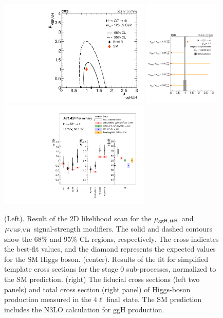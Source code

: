 \documentclass[10pt]{article}
\begin{document}
\begin{figure}[htb]
\centering
\includegraphics[height=2in]{figures/CMS-HIG-16-041_Figure_008-c.pdf}
\includegraphics[height=2in]{figures/CMS-HIG-16-041_Figure_009.pdf}
\includegraphics[height=2in]{figures/ATLAS-HIGG-2016-25__fig_07__xs.pdf}
\caption{
  (Left). Result of the 2D likelihood scan for the ${\rm \mu_{ggH,ttH}}$
  and ${\rm \mu_{VBF,VH}}$ signal-strength modifiers. The solid and dashed
  contours show the 68\% and 95\% CL regions, respectively. The cross
  indicates the best-fit values, and the diamond represents the expected
  values for the SM Higgs boson.
  (center). Results of the fit for simplified template cross sections for
  the stage 0 sub-processes, normalized to the SM prediction.
  (right) The fiducial cross sections (left two panels) and total cross
  section (right panel) of Higgs-boson production measured in the $4\ell$
  final state. The SM prediction includes the N3LO calculation for ggH
  production.
}
\label{fig:figure-ZZ-2}
\end{figure}
\end{document}
